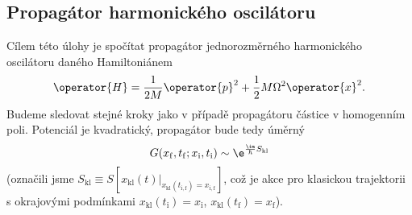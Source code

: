 \subsection{Propagátor harmonického oscilátoru}
Cílem této úlohy je spočítat propagátor jednorozměrného harmonického oscilátoru daného Hamiltoniánem
\begin{equation}
\operator{H}=\frac{1}{2M}\operator{p}^{2}+\frac{1}{2}M\Omega^{2}\operator{x}^{2}.
\end{equation}
Budeme sledovat stejné kroky jako v případě propagátoru částice v homogenním poli.
Potenciál je kvadratický, propagátor bude tedy úměrný 
\begin{equation}
G(x_{\mathrm{f}}, t_{\mathrm{f}}; x_{\mathrm{i}}, t_{\mathrm{i}})\sim\e^{\frac{\im}{\hbar}S_{\mathrm{kl}}}
\end{equation}
(označili jsme $S_{\mathrm{kl}}\equiv S\left[x_{\mathrm{kl}}(t)\big|_{x_{\mathrm{kl}}(t_{\mathrm{i,f}})=x_{\mathrm{i,f}}}\right]$,
což je akce pro klasickou trajektorii s okrajovými podmínkami 
$x_{\mathrm{kl}}(t_{\mathrm{i}})=x_{\mathrm{i}}$, $x_{\mathrm{kl}}(t_{\mathrm{f}})=x_{\mathrm{f}}$).

